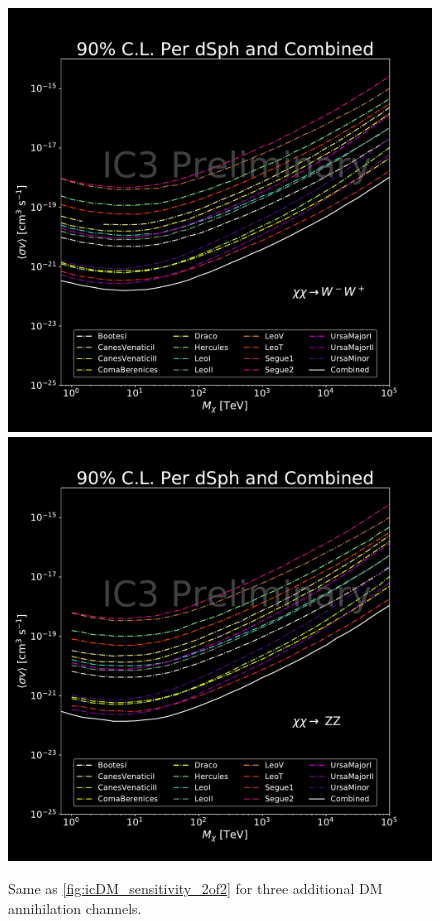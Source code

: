 \begin{figure}
{        \includegraphics[scale=0.265]{figures/ic_DM/dm_plots/WW_money_plot_comb.pdf}
        \includegraphics[scale=0.265]{figures/ic_DM/dm_plots/ZZ_money_plot_comb.pdf}}
    \caption{Same as \cref{fig:icDM_sensitivity_2of2} for three additional DM annihilation channels.}
    \label{fig:icDM_sensitivity_1of2}
\end{figure}

